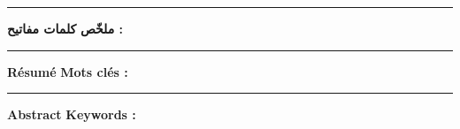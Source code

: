 

\thispagestyle{backcover}

\begin{changemargin}{3mm}{0cm}
    \begin{minipage}[c]{0.96\columnwidth}
        \vspace{3cm}
        \noindent\rule{17.3cm}{0.4pt}
        {\LARGE\textbf{ملخّص}}
        \vskip1mm
            \begingroup
                \small
                \@arabicAbstract
            \endgroup
        \vskip1mm
        {\textbf{كلمات مفاتيح : } 
            \begingroup
                \@arabicAbstractKeywords
            \endgroup
        }
        
        {
        {%
            \vskip5mm
        }{\vskip8mm}}
    	\vspace{3cm}
        \noindent\rule{17.3cm}{0.4pt}
        
        
        {\LARGE\textbf{Résumé}}
        \vskip1mm
            \begingroup
                \large
                \@frenchAbstract
            \endgroup
        \vskip1mm
        {\textbf{Mots clés : }
            \begingroup
                \@frenchAbstractKeywords
            \endgroup
        }
        
        {
        {%
            \vskip5mm
        }{\vskip8mm}}
    \vspace{3cm}
        \noindent\rule{17.3cm}{0.4pt}
        
        {\LARGE\textbf{Abstract}}
        \vskip1mm
            \begingroup
                \large
                \@englishAbstract
            \endgroup
        \vskip1mm
        {\textbf{Keywords : }
            \begingroup
                \@englishAbstractKeywords
            \endgroup
        }
   
    \end{minipage}
    
\end{changemargin}